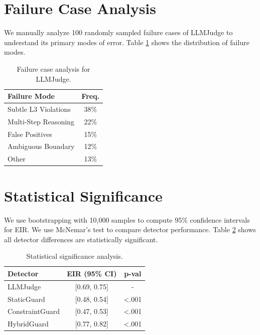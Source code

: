 \documentclass{article}
\begin{document}
\section{Failure Case Analysis}
\label{app:failure}

We manually analyze 100 randomly sampled failure cases of LLMJudge to understand its primary modes of error. Table \ref{tab:failure_cases} shows the distribution of failure modes.

\begin{table}[h]
\caption{Failure case analysis for LLMJudge.}
\label{tab:failure_cases}
\vskip 0.15in
\begin{center}
\begin{small}
\begin{sc}
\begin{tabular}{p{4.5cm}c}
\toprule
Failure Mode & Freq. \\
\midrule
Subtle L3 Violations & 38\% \\
Multi-Step Reasoning & 22\% \\
False Positives & 15\% \\
Ambiguous Boundary & 12\% \\
Other & 13\% \\
\bottomrule
\end{tabular}
\end{sc}
\end{small}
\end{center}
\vskip -0.1in
\end{table}

\section{Statistical Significance}
\label{app:stat_sig}

We use bootstrapping with 10,000 samples to compute 95\% confidence intervals for EIR. We use McNemar's test to compare detector performance. Table \ref{tab:statsig} shows all detector differences are statistically significant.

\begin{table}[h]
\caption{Statistical significance analysis.}
\label{tab:statsig}
\vskip 0.15in
\begin{center}
\begin{small}
\begin{sc}
\begin{tabular}{lcc}
\toprule
Detector & EIR (95\% CI) & p-val \\
\midrule
LLMJudge & [0.69, 0.75] & - \\
StaticGuard & [0.48, 0.54] & <.001 \\
ConstraintGuard & [0.47, 0.53] & <.001 \\
HybridGuard & [0.77, 0.82] & <.001 \\
\bottomrule
\end{tabular}
\end{sc}
\end{small}
\end{center}
\vskip -0.1in
\end{table}
\end{document}
